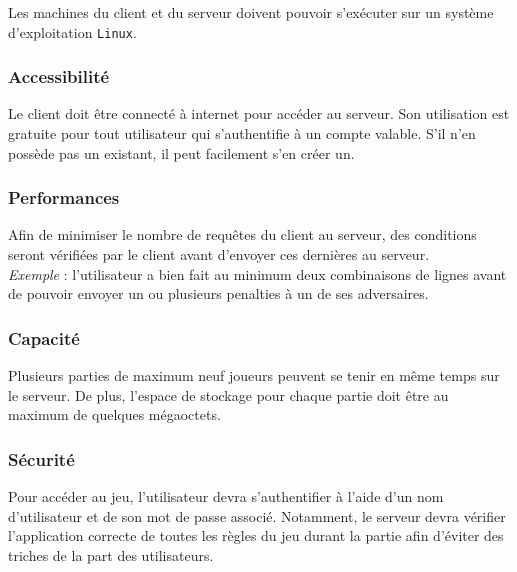 \documentclass{article}
\begin{document}
Les machines du client et du serveur doivent pouvoir s'exécuter sur un système d'exploitation \texttt{Linux}.

\subsubsection{Accessibilité}

Le client doit être connecté à internet pour accéder au serveur. Son utilisation est gratuite pour tout utilisateur qui s'authentifie à un compte valable. S'il n'en possède pas un existant, il peut facilement s'en créer un. 

\subsubsection{Performances}


Afin de minimiser le nombre de requêtes du client au serveur, des conditions seront vérifiées par le client avant d'envoyer ces dernières au serveur. \\

\textit{Exemple} : l'utilisateur a bien fait au minimum deux combinaisons de lignes avant de pouvoir envoyer un ou plusieurs penalties à un de ses adversaires.

\subsubsection{Capacité}


Plusieurs parties de maximum neuf joueurs peuvent se tenir en même temps sur le serveur. De plus, l'espace de stockage pour chaque partie doit être au maximum de quelques mégaoctets.

\subsubsection{Sécurité}


Pour accéder au jeu, l'utilisateur devra s'authentifier à l'aide d'un nom d'utilisateur et de son mot de passe associé. Notamment, le serveur devra vérifier l'application correcte de toutes les règles du jeu durant la partie afin d'éviter des triches de la part des utilisateurs.
\end{document}
